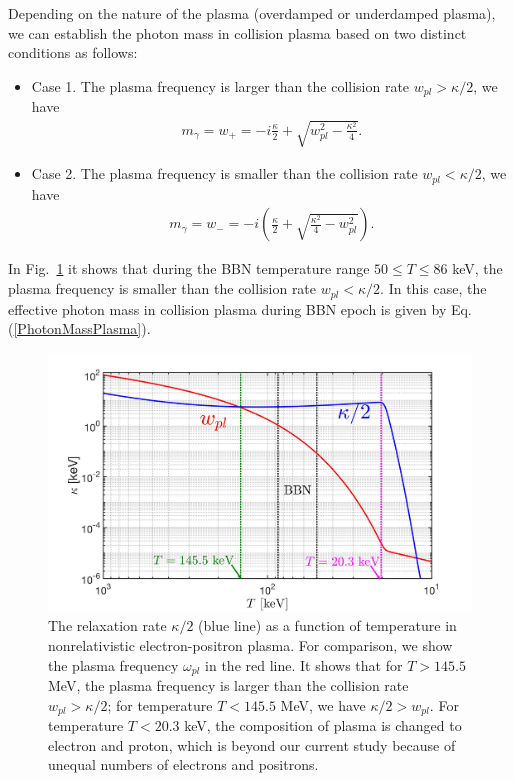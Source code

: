 Depending on the nature of the plasma (overdamped or underdamped plasma), we can establish the photon mass in collision plasma based on two distinct conditions as follows:
\begin{itemize}
\item Case 1. The plasma frequency is larger than the collision rate $w_{pl}>\kappa/2$, we have
\begin{align}
m_\gamma=w_+=-i\frac{\kappa}{2}+\sqrt{w^2_{pl}-\frac{\kappa^2}{4}}.
\end{align}
\item Case 2. The plasma frequency is smaller than the collision rate $w_{pl}<\kappa/2$, we have
\begin{align}\label{PhotonMassPlasma}
m_\gamma=w_-=-i\left(\frac{\kappa}{2}+\sqrt{\frac{\kappa^2}{4}-w^2_{pl}}\right).
\end{align}
\end{itemize}
In Fig.~\ref{RelaxationRate002_fig} it shows that during the BBN temperature range $50\leqslant T\leqslant 86$ keV, the plasma frequency is smaller than the collision rate $w_{pl}<\kappa/2$.  In this case, the effective photon mass in collision plasma during BBN epoch is given by Eq.(\ref{PhotonMassPlasma}).



\begin{figure}[h]
\begin{center}
\includegraphics[width=\linewidth]{./plots/KappaElectronPhotonMass_Talk}
\caption{The relaxation rate $\kappa/2$ (blue line) as a function of temperature in nonrelativistic electron-positron plasma. For comparison, we show the plasma frequency $\omega_{pl}$ in the red line. It shows that for $T>145.5$ MeV, the plasma frequency is larger than the collision rate $w_{pl}>\kappa/2$; for temperature $T<145.5$ MeV, we have $\kappa/2>w_{pl}$. For temperature $T<20.3$ keV, the composition of plasma is changed to electron and proton, which is beyond our current study because of unequal numbers of electrons and positrons.}
\label{RelaxationRate002_fig}
\end{center}
\end{figure}

